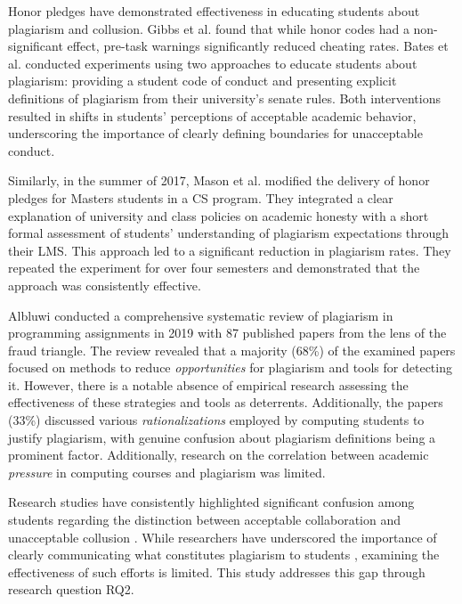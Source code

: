 Honor pledges have demonstrated effectiveness in educating students about plagiarism and collusion. Gibbs et al. \cite{10.1145/2724660.2728663} found that while honor codes had a non-significant effect, pre-task warnings significantly reduced cheating rates. Bates et al.\cite{bates2016academic} conducted experiments using two approaches to educate students about plagiarism: providing a student code of conduct and presenting explicit definitions of plagiarism from their university's senate rules. Both interventions resulted in shifts in students' perceptions of acceptable academic behavior, underscoring the importance of clearly defining boundaries for unacceptable conduct. 

Similarly, in the summer of 2017, Mason et al. \cite{10.1145/3287324.3287443} modified the delivery of honor pledges for Masters students in a CS program. They integrated a clear explanation of university and class policies on academic honesty with a short formal assessment of students' understanding of plagiarism expectations through their LMS. This approach led to a significant reduction in plagiarism rates. They repeated the experiment for over four semesters and demonstrated that the approach was consistently effective.

Albluwi \cite{10.1145/3371156} conducted a comprehensive systematic review of plagiarism in programming assignments in 2019 with 87 published papers from the lens of the fraud triangle. The review revealed that a majority (68\%) of the examined papers focused on methods to reduce \textit{opportunities} for plagiarism and tools for detecting it. However, there is a notable absence of empirical research assessing the effectiveness of these strategies and tools as deterrents. Additionally, the papers (33\%) discussed various \textit{rationalizations} employed by computing students to justify plagiarism, with genuine confusion about plagiarism definitions being a prominent factor. Additionally, research on the correlation between academic \textit{pressure} in computing courses and plagiarism was limited.

Research studies have consistently highlighted significant confusion among students regarding the distinction between acceptable collaboration and unacceptable collusion \cite{10.1145/2591708.2591755, 10.1145/2632320.2632342, Joy2011SourceCP}. While researchers have underscored the importance of clearly communicating what constitutes plagiarism to students \cite{10.1145/1595496.1562900, 10.1145/3160489.3160502, 10.1145/1734263.1734365, 10.1145/3024906.3024910}, examining the effectiveness of such efforts is limited. This study addresses this gap through research question RQ2.